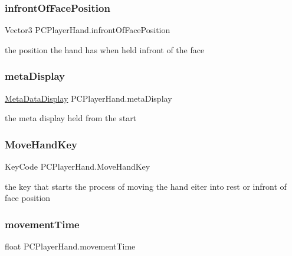\subsubsection{\texorpdfstring{infront\+Of\+Face\+Position}{infrontOfFacePosition}}
{\footnotesize\ttfamily Vector3 P\+C\+Player\+Hand.\+infront\+Of\+Face\+Position\hspace{0.3cm}{\ttfamily [private]}}



the position the hand has when held infront of the face 

\mbox{\label{class_p_c_player_hand_a132e4dc18579e0b2b561857fafaca912}} 
\subsubsection{\texorpdfstring{meta\+Display}{metaDisplay}}
{\footnotesize\ttfamily \mbox{\hyperlink{class_meta_data_display}{Meta\+Data\+Display}} P\+C\+Player\+Hand.\+meta\+Display\hspace{0.3cm}{\ttfamily [private]}}



the meta display held from the start 

\mbox{\label{class_p_c_player_hand_a4d757a10aeef1d8b06d19687218584f0}} 
\subsubsection{\texorpdfstring{Move\+Hand\+Key}{MoveHandKey}}
{\footnotesize\ttfamily Key\+Code P\+C\+Player\+Hand.\+Move\+Hand\+Key}



the key that starts the process of moving the hand eiter into rest or infront of face position 

\mbox{\label{class_p_c_player_hand_aaa5dc972ddaedd270c6f4c19a4c4f61b}} 
\subsubsection{\texorpdfstring{movement\+Time}{movementTime}}
{\footnotesize\ttfamily float P\+C\+Player\+Hand.\+movement\+Time\hspace{0.3cm}{\ttfamily [private]}}



